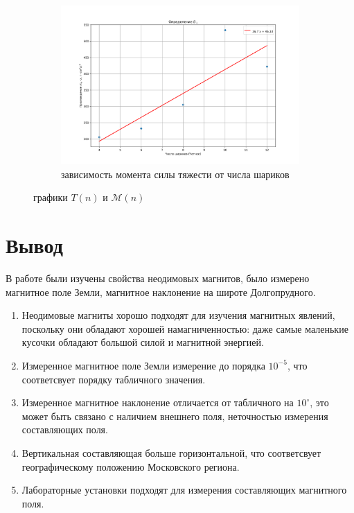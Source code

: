 \documentclass[a4paper, 12pt]{article}
\begin{document}
\begin{enumerate}
\begin{figure}[htbp]
\begin{subfigure}{0.8\textwidth}
            \centering
            \includegraphics[width=\linewidth]{vertical.png}
            \caption{зависимость момента силы тяжести от числа шариков}
            \label{вертикальная составляющая}
        \end{subfigure}
        \caption{графики $T(n)$ и $\mathcal{M}(n)$}
        \label{графики моментов и периодов}
    \end{figure}
\end{enumerate}
\section*{Вывод}
    В работе были изучены свойства неодимовых магнитов, было измерено магнитное поле Земли, магнитное наклонение на широте Долгопрудного.
    \begin{enumerate}
        \item Неодимовые магниты хорошо подходят для изучения магнитных явлений, поскольку они обладают хорошей намагниченностью: даже самые
        маленькие кусочки обладают большой силой и магнитной энергией.
        \item Измеренное магнитное поле Земли измерение до порядка $10^{-5}$, что соответсвует порядку табличного значения.
        \item Измеренное магнитное наклонение отличается от табличного на $10^{\circ}$, это может быть связано с наличием внешнего поля,
        неточностью измерения составляющих поля.
        \item Вертикальная  составляющая больше горизонтальной, что соответсвует географическому положению Московского региона.
        \item Лабораторные установки подходят для измерения составляющих магнитного поля.
    \end{enumerate}
\end{document}
